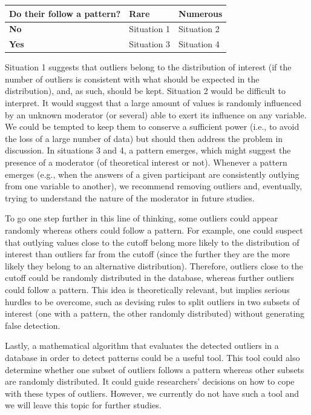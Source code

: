 \documentclass[man,floatsintext]{apa6}
\begin{document}
\begin{longtable}[]{@{}lll@{}}
\toprule
\textbf{Do their follow a pattern?} & Rare & Numerous\tabularnewline
\midrule
\endhead
\textbf{No} & Situation 1 & Situation 2\tabularnewline
\textbf{Yes} & Situation 3 & Situation 4\tabularnewline
\bottomrule
\end{longtable}

Situation 1 suggests that outliers belong to the distribution of interest (if the number of outliers is consistent with what should be expected in the distribution), and, as such, should be kept. Situation 2 would be difficult to interpret. It would suggest that a large amount of values is randomly influenced by an unknown moderator (or several) able to exert its influence on any variable. We could be tempted to keep them to conserve a sufficient power (i.e., to avoid the loss of a large number of data) but should then address the problem in discussion. In situations 3 and 4, a pattern emerges, which might suggest the presence of a moderator (of theoretical interest or not). Whenever a pattern emerges (e.g., when the answers of a given participant are consistently outlying from one variable to another), we recommend removing outliers and, eventually, trying to understand the nature of the moderator in future studies.

To go one step further in this line of thinking, some outliers could appear randomly whereas others could follow a pattern. For example, one could suspect that outlying values close to the cutoff belong more likely to the distribution of interest than outliers far from the cutoff (since the further they are the more likely they belong to an alternative distribution). Therefore, outliers close to the cutoff could be randomly distributed in the database, whereas further outliers could follow a pattern. This idea is theoretically relevant, but implies serious hurdles to be overcome, such as devising rules to split outliers in two subsets of interest (one with a pattern, the other randomly distributed) without generating false detection.

Lastly, a mathematical algorithm that evaluates the detected outliers in a database in order to detect patterns could be a useful tool. This tool could also determine whether one subset of outliers follows a pattern whereas other subsets are randomly distributed. It could guide researchers' decisions on how to cope with these types of outliers. However, we currently do not have such a tool and we will leave this topic for further studies.
\end{document}
